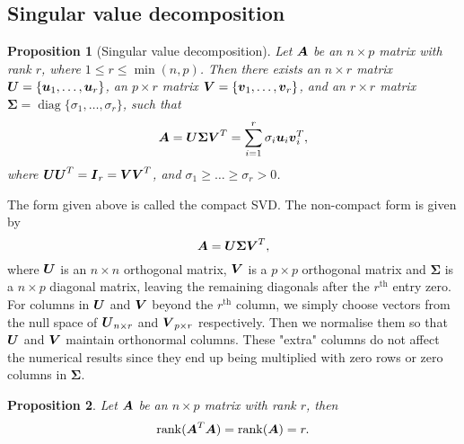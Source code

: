 \documentclass[12pt]{article}
\newtheorem{prop}{Proposition}[section]
\DeclareMathOperator{\rank}{rank}
\DeclareMathOperator{\diag}{diag}
\newcommand{\Sg}{\Sigma}
\begin{document}
	\subsection{Singular value decomposition}
	\begin{prop}[Singular value decomposition]
		Let $\boldsymbol{A}$ be an $n\times p$ matrix with rank $r$, where $1\leq r\leq \min(n,p)$. Then there exists an $n\times r$ matrix $\boldsymbol{U}=\{\boldsymbol{u}_1,\ldots,\boldsymbol{u}_r\}$, an $p\times r$ matrix $\boldsymbol{V}=\{\boldsymbol{v}_1,\ldots,\boldsymbol{v}_r\}$, and an $r\times r$ matrix $\boldsymbol{\Sg}=\diag\{\sigma_1,\ldots,\sigma_r\}$, such that
		\begin{equation}\label{eqn9}
			\bmA=\bmU\boldsymbol{\Sg}\bmV^T=\sum_{i=1}^{r}\sigma_i\bmu_i\bmv_i^T,
		\end{equation}
		where $\boldsymbol{U}\boldsymbol{U}^T=\boldsymbol{I}_r=\boldsymbol{V}\boldsymbol{V}^T$, and $\sigma_1\geq\ldots\geq\sigma_r>0$.
	\end{prop}
	
	The form given above is called the compact SVD. The non-compact form is given by
	\begin{equation}
		\bmA=\bmU\boldsymbol{\Sg}\bmV^T,
	\end{equation}
	where $\boldsymbol{U}$ is an $n\times n$ orthogonal matrix, $\boldsymbol{V}$ is a $p\times p$ orthogonal matrix and $\boldsymbol{\Sg}$ is a $n\times p$ diagonal matrix, leaving the remaining diagonals after the $r^{\text{th}}$ entry zero. For columns in $\boldsymbol{U}$ and $\boldsymbol{V}$ beyond the $r^{\text{th}}$ column, we simply choose vectors from the null space of $\boldsymbol{U}_{n\times r}$ and $\boldsymbol{V}_{p\times r}$ respectively. Then we normalise them so that $\boldsymbol{U}$ and $\boldsymbol{V}$ maintain orthonormal columns. These "extra" columns do not affect the numerical results since they end up being multiplied with zero rows or zero columns in $\boldsymbol{\Sg}$.

	\begin{prop}
		Let $\boldsymbol{A}$ be an $n\times p$ matrix with rank $r$, then 
		\begin{equation}
			\rank(\bmA^T\bmA)=\rank(\bmA)=r.
		\end{equation}
	\end{prop}
	
\end{document}
